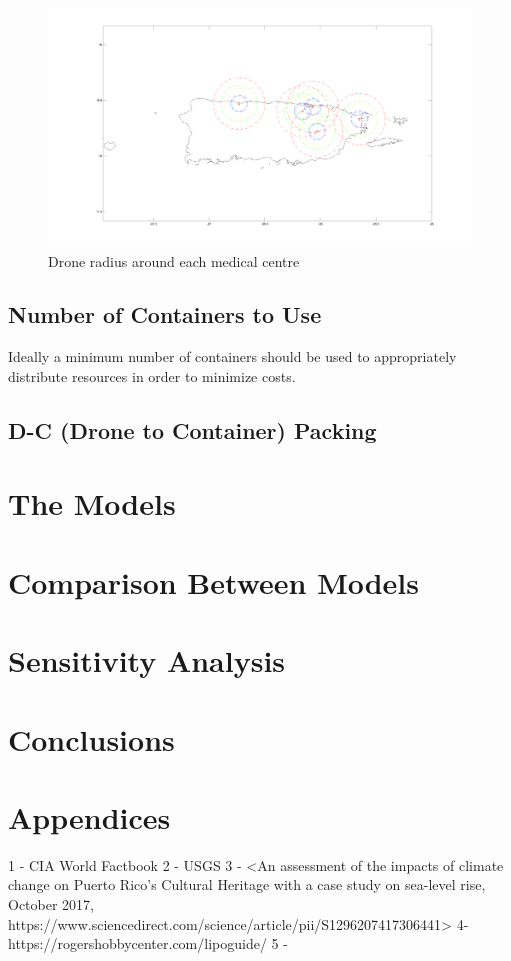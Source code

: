 \documentclass[a4paper,12pt]{article}
\begin{document}
\begin{figure}[h]
\centering
\includegraphics[scale =0.12]{CircleMapOne}
\caption{Drone radius around each medical centre }
\label{radius1}
\end{figure}

\subsection{Number of Containers to Use}
Ideally a minimum number of containers should be used to appropriately distribute resources in order to minimize costs.


\subsection{D-C (Drone to Container) Packing}



\newpage

\section{The Models}


\newpage

\section{Comparison Between Models}

\newpage

\section{Sensitivity Analysis}

\newpage

\section{Conclusions}

\newpage

\section{Appendices}
1 - CIA World Factbook
2 - USGS
3 - <An assessment of the impacts of climate change on Puerto Rico's Cultural Heritage with a case study on sea-level rise, October 2017, https://www.sciencedirect.com/science/article/pii/S1296207417306441>
4- https://rogershobbycenter.com/lipoguide/
5 -
\end{document}
